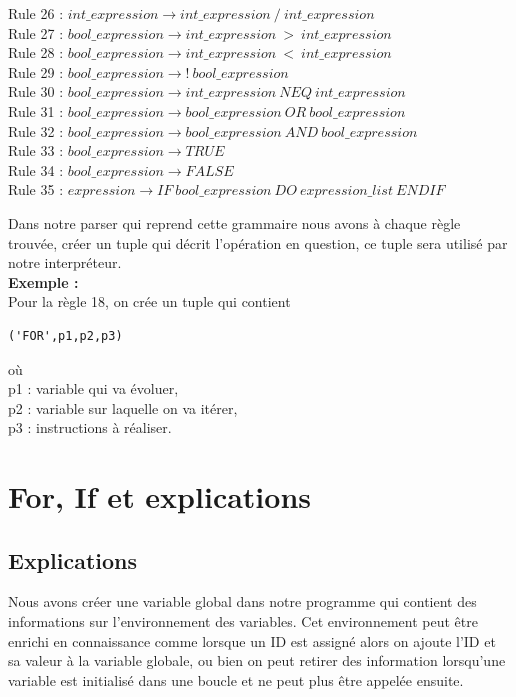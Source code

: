 \documentclass[10pt,a4paper]{article}
\begin{document}
\begin{flushleft}
Rule 26 : $int\_expression \rightarrow int\_expression\ /\ int\_expression$\\
Rule 27 : $bool\_expression \rightarrow int\_expression\ >\ int\_expression$\\
Rule 28 : $bool\_expression \rightarrow int\_expression\ <\ int\_expression$\\
Rule 29 : $bool\_expression \rightarrow !\ bool\_expression$\\
Rule 30 : $bool\_expression \rightarrow int\_expression\ NEQ\ int\_expression$\\
Rule 31 : $bool\_expression \rightarrow bool\_expression\ OR\ bool\_expression$\\
Rule 32 : $bool\_expression \rightarrow bool\_expression\ AND\ bool\_expression$\\
Rule 33 : $bool\_expression \rightarrow TRUE$\\
Rule 34 : $bool\_expression \rightarrow FALSE$\\
Rule 35 : $expression \rightarrow IF\ bool\_expression\ DO\ expression\_list\ ENDIF$\\
\end{flushleft}

Dans notre parser qui reprend cette grammaire nous avons à chaque règle trouvée, créer un tuple qui décrit l'opération en question, ce tuple sera utilisé par notre interpréteur. \\


\textbf{Exemple :}\\
Pour la règle 18, on crée un tuple qui contient 
\begin{verbatim}
('FOR',p1,p2,p3)
\end{verbatim}
où \\p1 : variable qui va évoluer,\\ p2 : variable sur laquelle on va itérer,\\ p3 : instructions à réaliser. 

\section{For, If et explications}
\subsection{Explications}
Nous avons créer une variable global dans notre programme qui contient des informations sur l'environnement des variables.
Cet environnement peut être enrichi en connaissance comme lorsque un ID est assigné alors on ajoute l'ID et sa valeur à la variable globale, ou bien on peut retirer des information lorsqu'une variable est initialisé dans une boucle et ne peut plus être appelée ensuite.
\end{document}
